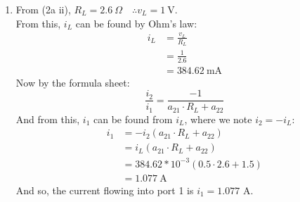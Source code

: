 \begin{enumerate}
{\begin{enumerate}
		\item{
			From (2a ii), $R_L = 2.6 \ \Omega \quad \therefore v_L = 1 \ \text{V}$. \\
			From this, $i_L$ can be found by Ohm's law:
			\begin{align*}
				i_L &= \frac{v_L}{R_L} \\
				&= \frac{1}{2.6} \\
				&= 384.62 \ \text{mA}
			\end{align*}
			Now by the formula sheet:
			\begin{equation*}
				\frac{i_2}{i_1} = \frac{-1}{a_{21} \cdot R_L + a_{22}}
			\end{equation*}
			And from this, $i_1$ can be found from $i_L$, where we note $i_2 = -i_L$:
			\begin{align*}
				i_1 &= -i_2 \left(a_{21} \cdot R_L + a_{22} \right) \\
				&= i_L \left(a_{21} \cdot R_L + a_{22} \right) \\
				&= 384.62 * 10^{-3} \left(0.5 \cdot 2.6 + 1.5 \right) \\
				&= 1.077 \ \text{A}
			\end{align*}
			And so, the current flowing into port 1 is $i_1 = 1.077$ A.
			\\
		}
	\end{enumerate}

	}
	

\end{enumerate}
